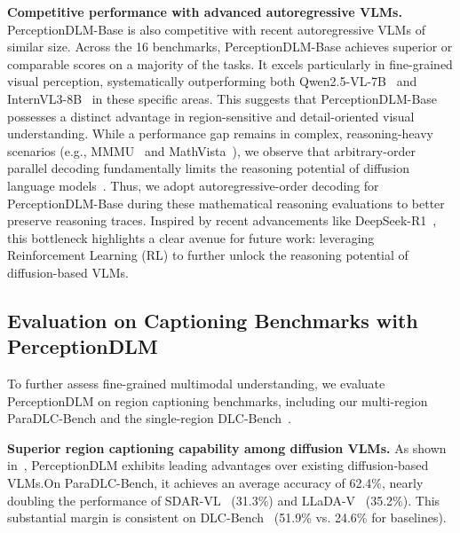 \documentclass{llmxive}
\begin{document}
\noindent
\textbf{Competitive performance with advanced autoregressive VLMs.}
PerceptionDLM-Base is also competitive with recent autoregressive VLMs of similar size. Across the 16 benchmarks, PerceptionDLM-Base achieves superior or comparable scores on a majority of the tasks. 
%
It excels particularly in fine-grained visual perception, systematically outperforming both Qwen2.5-VL-7B~\citep{bai2025qwen25vl} and InternVL3-8B~\citep{zhu2025internvl3} in these specific areas. 
%
This suggests that PerceptionDLM-Base possesses a distinct advantage in region-sensitive and detail-oriented visual understanding. While a performance gap remains in complex, reasoning-heavy scenarios (e.g., MMMU~\citep{yue2024mmmu} and MathVista~\citep{lu2023mathvista}), we observe that arbitrary-order parallel decoding fundamentally limits the reasoning potential of diffusion language models~\citep{ni2026flexibility}. Thus, we adopt autoregressive-order decoding for PerceptionDLM-Base during these mathematical reasoning evaluations to better preserve reasoning traces. Inspired by recent advancements like DeepSeek-R1~\citep{guo2025deepseek}, this bottleneck highlights a clear avenue for future work: leveraging Reinforcement Learning (RL) to further unlock the reasoning potential of diffusion-based VLMs.


\vspace{-2mm}
\subsection{Evaluation on Captioning Benchmarks with PerceptionDLM}
\vspace{-2mm}
To further assess fine-grained multimodal understanding, we evaluate PerceptionDLM on region captioning benchmarks, including our multi-region ParaDLC-Bench and the single-region DLC-Bench~\citep{lian2025describe}.

\noindent
\textbf{Superior region captioning capability among diffusion VLMs.}
As shown in~, PerceptionDLM exhibits leading advantages over existing diffusion-based VLMs.On ParaDLC-Bench, it achieves an average accuracy of 62.4\%, nearly doubling the performance of SDAR-VL~\citep{cheng2025sdar} (31.3\%) and LLaDA-V~\citep{you2025llada} (35.2\%). This substantial margin is consistent on DLC-Bench~\citep{lian2025describe} (51.9\% vs. 24.6\% for baselines). 
\end{document}
